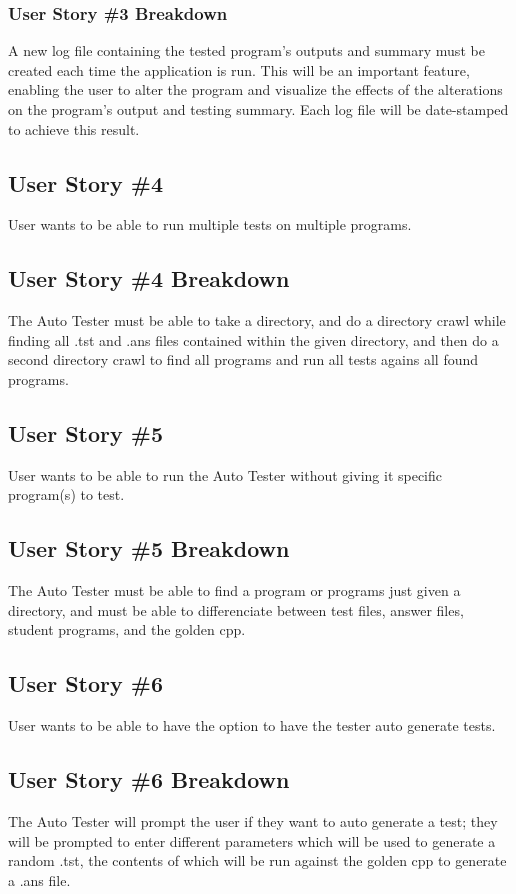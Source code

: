 \subsubsection{User Story \#3 Breakdown}
A new log file containing the tested program's outputs and summary must be created each time the application is run.
This will be an important feature, enabling the user to alter the program and visualize the effects of the alterations on
the program's output and testing summary.  Each log file will be date-stamped to achieve this result.

\subsection{User Story \#4}
User wants to be able to run multiple tests on multiple programs.

\subsection{User Story \#4 Breakdown}
The Auto Tester must be able to take a directory, and do a directory crawl while finding all .tst and .ans files contained 
within the given directory, and then do a second directory crawl to find all programs and run all tests agains all found 
programs. 

\subsection{User Story \#5}
User wants to be able to run the Auto Tester without giving it specific program(s) to test.

\subsection{User Story \#5 Breakdown}
The Auto Tester must be able to find a program or programs just given a directory, and must be able to differenciate 
between test files, answer files, student programs, and the golden cpp.

\subsection{User Story \#6}
User wants to be able to have the option to have the tester auto generate tests.

\subsection{User Story \#6 Breakdown}
The Auto Tester will prompt the user if they want to auto generate a test; they will be prompted to enter different 
parameters which will be used to generate a random .tst, the contents of which will be run against the golden cpp to 
generate a .ans file.


